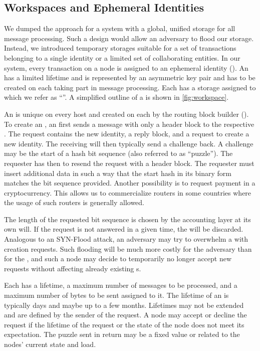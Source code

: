 \subsection{Workspaces and Ephemeral Identities}
We dumped the approach for a system with a global, unified storage for all message processing. Such a design would allow an adversary to flood our storage. Instead, we introduced temporary storages suitable for a set of transactions belonging to a single identity or a limited set of collaborating entities. In our system, every transaction on a node is assigned to an ephemeral identity (). An  has a limited lifetime and is represented by an asymmetric key pair and has to be created on each \VortexNode{} taking part in message processing. Each  has a storage assigned to which we refer as ``''. A simplified outline of a  is shown in \cref{fig:workspace}.

An  is unique on every host and created on each \VortexNode{} by the routing block builder (). To create an , an  first sends a message with only a header block to the respective \VortexNode. The request contains the new identity, a reply block, and a request to create a new identity. The receiving \VortexNode{} will then typically send a challenge back. A challenge may be the start of a hash bit sequence (also referred to as ``puzzle''). The requester has then to resend the request with a header block. The requester must insert additional data in such a way that the start hash in its binary form matches the bit sequence provided. Another possibility is to request payment in a cryptocurrency. This allows us to commercialize routers in some countries where the usage of such routers is generally allowed.

The length of the requested bit sequence is chosen by the accounting layer at its own will. If the request is not answered in a given time, the  will be discarded. Analogous to an SYN-Flood attack, an adversary may try to overwhelm a \VortexNode{} with  creation requests. Such flooding will be much more costly for the adversary than for the \VortexNode{}, and such a node may decide to temporarily no longer accept new  requests without affecting already existing s.

Each  has a lifetime, a maximum number of messages to be processed, and a maximum number of bytes to be sent assigned to it. The lifetime of an  is typically days and maybe up to a few months. Lifetimes may not be extended and are defined by the sender of the request. A node may accept or decline the request if the lifetime of the request or the state of the node does not meet its expectation. The puzzle sent in return may be a fixed value or related to the nodes' current state and load.

